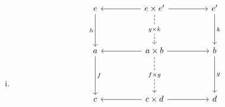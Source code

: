 \documentclass[12pt]{article}
\begin{document}
\begin{exercise}
\begin{enumerate}[(i)]
            \item
            \[\begin{tikzcd}
                {e} && {e \times e'} && {e'} \\
                \\
                {a} && {a \times b} && {b} \\
                && {} \\
                {c} && {c \times d} && {d} \\
                \\
                \\
                \\
                && {}
                \arrow["{f}", from=3-1, to=5-1]
                \arrow["{g}", from=3-5, to=5-5]
                \arrow[from=3-3, to=3-1]
                \arrow[from=3-3, to=3-5]
                \arrow[from=5-3, to=5-1]
                \arrow[from=5-3, to=5-5]
                \arrow["{f\times g}" description, from=3-3, to=5-3, dashed]
                \arrow["{h}"', from=1-1, to=3-1]
                \arrow[from=1-3, to=1-1]
                \arrow[from=1-3, to=1-5]
                \arrow["{g \times k}" description, from=1-3, to=3-3, dashed]
                \arrow["{k}", from=1-5, to=3-5]
            \end{tikzcd}\]
        \end{enumerate}
    \end{exercise}

    
\end{document}
